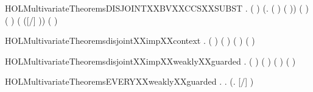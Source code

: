 \newcommand{\HOLMultivariateTheoremscontextXXvar}{\UseVerbatim{HOLMultivariateTheoremscontextXXvar}}
\begin{SaveVerbatim}{HOLMultivariateTheoremsDISJOINTXXBVXXCCSXXSUBST}
\HOLTokenTurnstile{} \HOLSymConst{\HOLTokenForall{}}  .
         \HOLSymConst{\HOLTokenConj{}} (  \HOLSymConst{=}  ) \HOLSymConst{\HOLTokenConj{}}
        (\HOLTokenLambda{}.  ( ) ( ))  \HOLSymConst{\HOLTokenConj{}}
        ( ) ( ) \HOLSymConst{\HOLTokenImp{}}
        ( ([/] )) ( )
\end{SaveVerbatim}
\newcommand{\HOLMultivariateTheoremsDISJOINTXXBVXXCCSXXSUBST}{\UseVerbatim{HOLMultivariateTheoremsDISJOINTXXBVXXCCSXXSUBST}}
\begin{SaveVerbatim}{HOLMultivariateTheoremsdisjointXXimpXXcontext}
\HOLTokenTurnstile{} \HOLSymConst{\HOLTokenForall{}} .
        ( ) ( ) \HOLSymConst{\HOLTokenConj{}}  ( ) ( ) \HOLSymConst{\HOLTokenImp{}}
         
\end{SaveVerbatim}
\newcommand{\HOLMultivariateTheoremsdisjointXXimpXXcontext}{\UseVerbatim{HOLMultivariateTheoremsdisjointXXimpXXcontext}}
\begin{SaveVerbatim}{HOLMultivariateTheoremsdisjointXXimpXXweaklyXXguarded}
\HOLTokenTurnstile{} \HOLSymConst{\HOLTokenForall{}} .
        ( ) ( ) \HOLSymConst{\HOLTokenConj{}}  ( ) ( ) \HOLSymConst{\HOLTokenImp{}}
         
\end{SaveVerbatim}
\newcommand{\HOLMultivariateTheoremsdisjointXXimpXXweaklyXXguarded}{\UseVerbatim{HOLMultivariateTheoremsdisjointXXimpXXweaklyXXguarded}}
\begin{SaveVerbatim}{HOLMultivariateTheoremsEVERYXXweaklyXXguarded}
\HOLTokenTurnstile{} \HOLSymConst{\HOLTokenForall{}} .
          \HOLSymConst{\HOLTokenImp{}}
       \HOLSymConst{\HOLTokenForall{}} .    \HOLSymConst{\HOLTokenConj{}}    \HOLSymConst{\HOLTokenImp{}}  (\HOLTokenLambda{}. [/] )
\end{SaveVerbatim}
